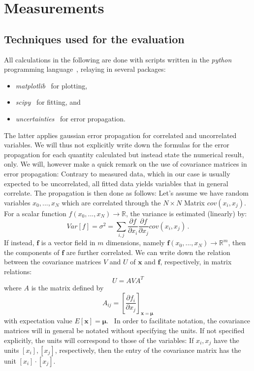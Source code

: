 \section{Measurements}
\subsection{Techniques used for the evaluation}
All calculations in the following are done with scripts written in 
the \textit{python} programming language~\cite{python}, relaying in several 
packages:
\begin{itemize}
    \item
        \textit{matplotlib}~\cite{Hunter2007} for plotting,
    \item
        \textit{scipy}~\cite{scipy} for fitting, and 
    \item
        \textit{uncertainties}~\cite{uc} for error propagation.
\end{itemize}
The latter applies gaussian error propagation for correlated and uncorrelated variables. 
We will thus not explicitly write down the formulas for the error propagation 
for each quantity calculated but instead state the numerical result, only. 
We will, however make a quick remark on the use of covariance matrices in 
error propagation: Contrary to measured data, which in our case is usually 
expected to be uncorrelated, all fitted data yields variables that in general correlate. 
The propagation is then done as follows:
Let's assume we have random
variables $x_0,...,x_N$ which are correlated through the $N\times N$ Matrix $cov(x_i,x_j)$.
For a scalar function $f(x_0,...,x_N) \rightarrow \mathbb{R}$, the variance is estimated (linearly) by:
\begin{equation}
Var[f] = \sigma^2 = \sum_{i,j} \frac{\partial f}{\partial x_i} \frac{\partial f}{\partial x_j} cov(x_i,x_j) \,.
\end{equation} 
If instead, $\mathbf{f}$ is a vector field in $m$ dimensions, namely 
$\mathbf{f}(x_0,...,x_N) \rightarrow \mathbb{R}^m$, then the components of $\mathbf{f}$ 
are further correlated. We can write down the relation between the covariance matrices $V$ and $U$ of 
$\mathbf{x}$ and $\mathbf{f}$, respectively, in matrix relations:
\begin{equation}
    U = A V A^T
\end{equation}
where $A$ is the matrix defined by 
\begin{equation}
    A_{ij} = \left[ \frac{\partial f_i}{\partial x_j}\right]_{\mathbf{x} = \mathbf{\mu}}
\end{equation}
with expectation value $E[\mathbf{x}] = \mathbf{\mu}$.~\cite{cowan1998statistical}
In order to facilitate notation, the covariance matrices will in general be notated without 
specifying the units. If not specified explicitly, the units will correspond to those of the
variables: If $x_i, x_j$ have the units $[x_i], [x_j]$, respectively, 
then the entry of the covariance matrix has the unit $[x_i] \cdot [x_j]$. 


